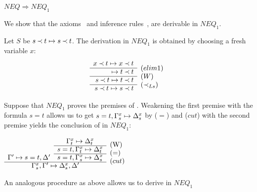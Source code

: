 \begin{LEMMA}\label{le:neqtoneq1} $NEQ \Rightarrow NEQ_1$ \end{LEMMA}
\begin{PROOF}
We show that the axioms~ and inference rules~,
 are derivable in $NEQ_1$.
\begin{LS}\MyLPar
\item Let $S$ be $s\mathbin{\prec} t\mathrel{\mapsto} s\mathbin{\prec} t$. The derivation in $NEQ_1$
is obtained by choosing a fresh variable $x$:\ \ \ 
\[\prar{
  x\Incl t\Seq x\Incl t \cl
  \Seq t\Incl t & \rabove{(elim1)}   \cl
  s\Incl t\Seq t\Incl t & \rabove{(W)}  \cl
  s\Incl t\Seq s\Incl t & \rabove{\iLs}
}
\]
\item Suppose that $NEQ_1$ proves the premises of . Weakening the
first premise with the formula $s=t$ allows us to get $s=t,\Gamma_s^x\mathrel{\mapsto}\Delta_s^x$ by
($=$) and ($cut$) with the second premise yields the conclusion of 
\reff{ru:neqeq} in $NEQ_1$:
\begin{center} \( \begin{array}{ccl}
 & \Gamma_t^x\Seq\Delta_t^x & \raisebox{-1.2ex}[1.5ex][0ex]{(W)} \\ \cline{2-2}
 & s=t,\Gamma_t^x\Seq\Delta_t^x & \raisebox{-1.2ex}[1.5ex][0ex]{($=$)} 
      \\ \cline{2-2}
\Gamma'\Seq s=t,\Delta' & s=t,\Gamma_s^x\Seq\Delta_s^x 
   & \raisebox{-1.2ex}[1.5ex][0ex]{($cut$)} \\ \cline{1-2}
\multicolumn{2}{c}{\Gamma_s^x,\Gamma'\Seq\Delta_s^x,\Delta'}
\end{array} \) \end{center}
\item An analogous procedure as above allows us to derive  in $NEQ_1$
\end{LS}
\end{PROOF}


